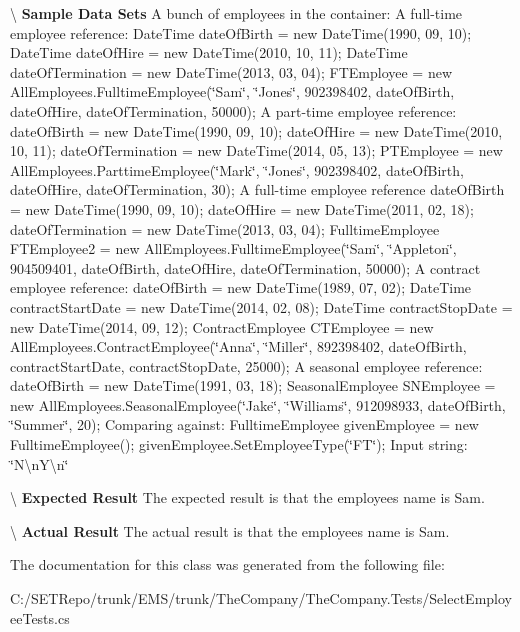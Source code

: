 \textbackslash{} {\bfseries  Sample Data Sets} A bunch of employees in the container\+: A full-\/time employee reference\+: Date\+Time date\+Of\+Birth = new Date\+Time(1990, 09, 10); Date\+Time date\+Of\+Hire = new Date\+Time(2010, 10, 11); Date\+Time date\+Of\+Termination = new Date\+Time(2013, 03, 04); F\+T\+Employee = new All\+Employees.\+Fulltime\+Employee(\char`\"{}\+Sam\char`\"{}, \char`\"{}\+Jones\char`\"{}, 902398402, date\+Of\+Birth, date\+Of\+Hire, date\+Of\+Termination, 50000); A part-\/time employee reference\+: date\+Of\+Birth = new Date\+Time(1990, 09, 10); date\+Of\+Hire = new Date\+Time(2010, 10, 11); date\+Of\+Termination = new Date\+Time(2014, 05, 13); P\+T\+Employee = new All\+Employees.\+Parttime\+Employee(\char`\"{}\+Mark\char`\"{}, \char`\"{}\+Jones\char`\"{}, 902398402, date\+Of\+Birth, date\+Of\+Hire, date\+Of\+Termination, 30); A full-\/time employee reference date\+Of\+Birth = new Date\+Time(1990, 09, 10); date\+Of\+Hire = new Date\+Time(2011, 02, 18); date\+Of\+Termination = new Date\+Time(2013, 03, 04); Fulltime\+Employee F\+T\+Employee2 = new All\+Employees.\+Fulltime\+Employee(\char`\"{}\+Sam\char`\"{}, \char`\"{}\+Appleton\char`\"{}, 904509401, date\+Of\+Birth, date\+Of\+Hire, date\+Of\+Termination, 50000); A contract employee reference\+: date\+Of\+Birth = new Date\+Time(1989, 07, 02); Date\+Time contract\+Start\+Date = new Date\+Time(2014, 02, 08); Date\+Time contract\+Stop\+Date = new Date\+Time(2014, 09, 12); Contract\+Employee C\+T\+Employee = new All\+Employees.\+Contract\+Employee(\char`\"{}\+Anna\char`\"{}, \char`\"{}\+Miller\char`\"{}, 892398402, date\+Of\+Birth, contract\+Start\+Date, contract\+Stop\+Date, 25000); A seasonal employee reference\+: date\+Of\+Birth = new Date\+Time(1991, 03, 18); Seasonal\+Employee S\+N\+Employee = new All\+Employees.\+Seasonal\+Employee(\char`\"{}\+Jake\char`\"{}, \char`\"{}\+Williams\char`\"{}, 912098933, date\+Of\+Birth, \char`\"{}\+Summer\char`\"{}, 20); Comparing against\+: Fulltime\+Employee given\+Employee = new Fulltime\+Employee(); given\+Employee.\+Set\+Employee\+Type(\char`\"{}\+F\+T\char`\"{}); Input string\+: \char`\"{}\+N\textbackslash{}n\+Y\textbackslash{}n\char`\"{}

\textbackslash{} {\bfseries  Expected Result} The expected result is that the employee\textquotesingle{}s name is Sam.

\textbackslash{} {\bfseries  Actual Result} The actual result is that the employee\textquotesingle{}s name is Sam. 

The documentation for this class was generated from the following file\+:\begin{DoxyCompactItemize}
\item 
C\+:/\+S\+E\+T\+Repo/trunk/\+E\+M\+S/trunk/\+The\+Company/\+The\+Company.\+Tests/Select\+Employee\+Tests.\+cs\end{DoxyCompactItemize}
